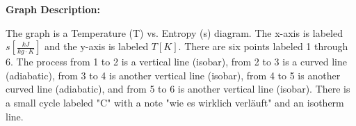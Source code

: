 

\item[a)] 
    \begin{center}
        \textbf{Graph Description:}
        
        The graph is a Temperature (T) vs. Entropy (s) diagram. The x-axis is labeled \( s \left[ \frac{kJ}{kg \cdot K} \right] \) and the y-axis is labeled \( T \left[ K \right] \). There are six points labeled 1 through 6. The process from 1 to 2 is a vertical line (isobar), from 2 to 3 is a curved line (adiabatic), from 3 to 4 is another vertical line (isobar), from 4 to 5 is another curved line (adiabatic), and from 5 to 6 is another vertical line (isobar). There is a small cycle labeled "C" with a note "wie es wirklich verläuft" and an isotherm line.
    \end{center}